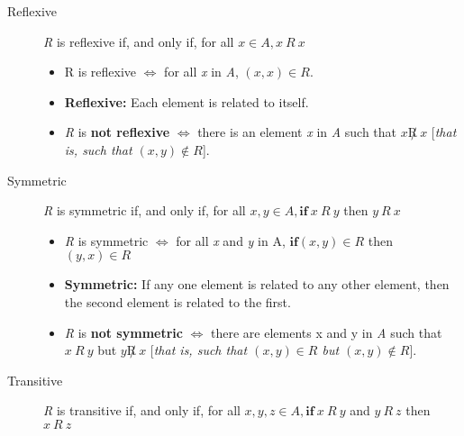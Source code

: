 \documentclass[12pt]{article}
\begin{document}
\begin{description}

\item [Reflexive] \textit{R} is reflexive if, and only if, for all $x \in A, x \ \textit{R} \ x$

\begin{itemize}
\item R is reflexive \hspace{10pt} $\Leftrightarrow$ \hspace{10pt} for all \textit{x} in \textit{A}, $(x, x) \in R$.
\item \textbf{Reflexive:} Each element is related to itself.
\item \textit{R} is \textbf{not reflexive} \hspace{10pt} $\Leftrightarrow$ \hspace{10pt} there is an element \textit{x} in \textit{A} such that $x \not R \ x$ [\textit{that is, such that $(x, y) \not \in R$}].
\end{itemize}

\item [Symmetric] \textit{R} is symmetric if, and only if, for all $x, y \in A, \textbf{if} \ x \ \textit{R} \ y$ then $y \ \textit{R} \ x$

\begin{itemize}
\item \textit{R} is symmetric \hspace{10pt} $\Leftrightarrow$ \hspace{10pt} for all \textit{x} and \textit{y} in A, $\textbf{if} (x, y) \in R$ then $(y, x) \in \textit{R}$
\item \textbf{Symmetric:} If any one element is related to any other element, then the second element is related to the first.
\item \textit{R} is \textbf{not symmetric} \hspace{10pt} $\Leftrightarrow$ \hspace{10pt} there are elements x and y in \textit{A} such that $x \ R \ y$ but $y \not R \ x$ [\textit{that is, such that $(x, y) \in R$ but $(x, y) \not \in R$}].
\end{itemize}

\item [Transitive] \textit{R} is transitive if, and only if, for all $x, y, z \in A, \textbf{if} \ x \ \textit{R} \ y$ and $y \ \textit{R} \ z$ then $x \ \textit{R} \ z$


\end{description}
\end{document}
